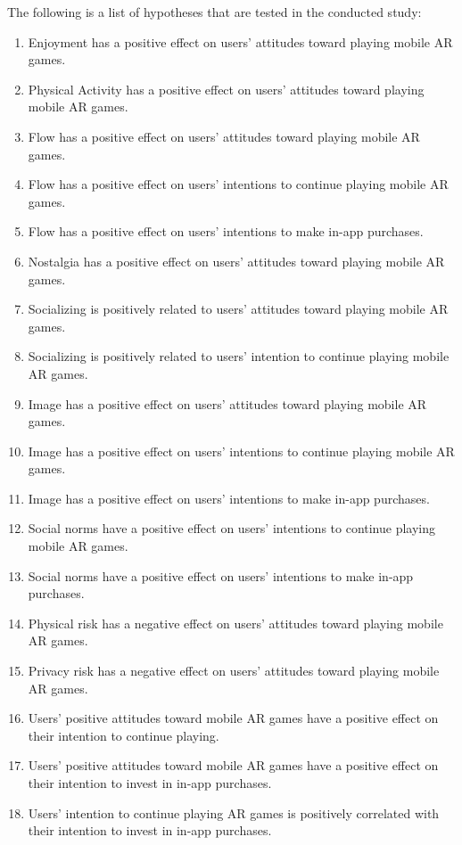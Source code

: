 \documentclass[runningheads]{llncs}
\begin{document}
\par The following is a list of hypotheses that are tested in the conducted study:
\begin{enumerate}
    \item Enjoyment has a positive effect on users' attitudes toward playing mobile AR games.
    \item Physical Activity has a positive effect on users' attitudes toward playing mobile AR games.
    \item Flow has a positive effect on users' attitudes toward playing mobile AR games.
    \item Flow has a positive effect on users' intentions to continue playing mobile AR games.
    \item Flow has a positive effect on users' intentions to make in-app purchases.
    \item Nostalgia has a positive effect on users' attitudes toward playing mobile AR games.
    \item Socializing is positively related to users' attitudes toward playing mobile AR games.
    \item Socializing is positively related to users' intention to continue playing mobile AR games.
    \item Image has a positive effect on users' attitudes toward playing mobile AR games.
    \item Image has a positive effect on users' intentions to continue playing mobile AR games.
    \item Image has a positive effect on users' intentions to make in-app purchases.
    \item Social norms have a positive effect on users' intentions to continue playing mobile AR games.
    \item Social norms have a positive effect on users' intentions to make in-app purchases.
    \item Physical risk has a negative effect on users' attitudes toward playing mobile AR games.
    \item Privacy risk has a negative effect on users' attitudes toward playing mobile AR games.
    \item Users' positive attitudes toward mobile AR games have a positive effect on their intention to continue playing.
    \item Users' positive attitudes toward mobile AR games have a positive effect on their intention to invest in in-app purchases.
    \item Users' intention to continue playing AR games is positively correlated with their intention to invest in in-app purchases.
\end{enumerate}
\end{document}
